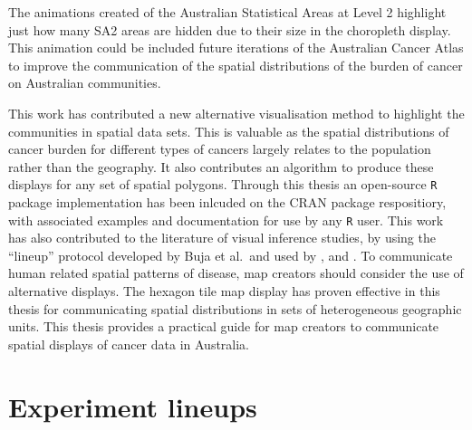 \documentclass{monashthesis}
\begin{document}
The animations created of the Australian Statistical Areas at Level 2 highlight just how many SA2 areas are hidden due to their size in the choropleth display. This animation could be included future iterations of the Australian Cancer Atlas to improve the communication of the spatial distributions of the burden of cancer on Australian communities.

This work has contributed a new alternative visualisation method to highlight the communities in spatial data sets. This is valuable as the spatial distributions of cancer burden for different types of cancers largely relates to the population rather than the geography. It also contributes an algorithm to produce these displays for any set of spatial polygons. Through this thesis an open-source \texttt{R} package implementation has been inlcuded on the CRAN package respositiory, with associated examples and documentation for use by any \texttt{R} user.
This work has also contributed to the literature of visual inference studies, by using the ``lineup'' protocol developed by Buja et al.~and used by \textcite{GIIV}, and \textcite{GTPCCD}.
To communicate human related spatial patterns of disease, map creators should consider the use of alternative displays. The hexagon tile map display has proven effective in this thesis for communicating spatial distributions in sets of heterogeneous geographic units. This thesis provides a practical guide for map creators to communicate spatial displays of cancer data in Australia.

\appendix

\hypertarget{experiment-lineups}{%
\chapter{Experiment lineups}\label{experiment-lineups}}
\end{document}
